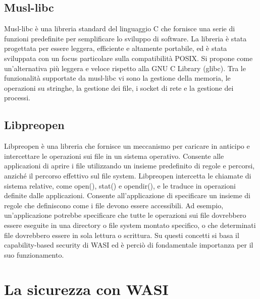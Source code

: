 \subsection{Musl-libc}
Musl-libc è una libreria standard del linguaggio C che fornisce una serie di funzioni predefinite per semplificare lo
sviluppo di software. La libreria è stata progettata per essere leggera, efficiente e altamente portabile, ed è stata
sviluppata con un focus particolare sulla compatibilità POSIX. Si propone come un'alternativa più leggera e veloce
rispetto alla GNU C Library (glibc). Tra le funzionalità supportate da musl-libc vi sono la gestione della memoria, le
operazioni su stringhe, la gestione dei file, i socket di rete e la gestione dei processi.
\subsection{Libpreopen}
\label{sec:libpreopen}
Libpreopen è una libreria che fornisce un meccanismo per caricare in anticipo e intercettare le operazioni sui file in
un sistema operativo. Consente alle applicazioni di aprire i file utilizzando un insieme predefinito di regole e
percorsi, anziché il percorso effettivo sul file system. Libpreopen intercetta le chiamate di sistema relative, come
open(), stat() e opendir(), e le traduce in operazioni definite dalle applicazioni. Consente all'applicazione di
specificare un insieme di regole che definiscono come i file devono essere accessibili. Ad esempio, un'applicazione
potrebbe specificare che tutte le operazioni sui file dovrebbero essere eseguite in una directory o file system montato
specifico, o che determinati file dovrebbero essere in sola lettura o scrittura. Su questi concetti si basa il
capability-based security di WASI ed è perciò di fondamentale importanza per il suo funzionamento.
\section{La sicurezza con WASI}
